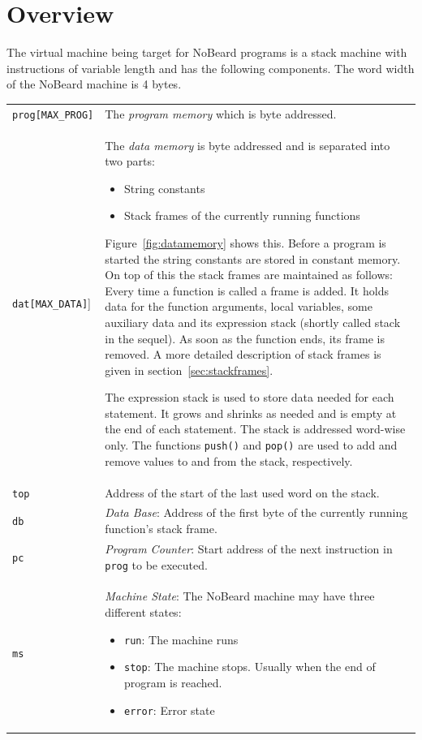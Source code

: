 \documentclass[11pt]{report}
\newcommand{\leongage}{NoBeard}
\begin{document}
\section{Overview}
The virtual machine being target for \leongage{} programs is a stack machine with instructions of variable length and has the following components. The word width of the \leongage{} machine is 4 bytes.

\begin{tabular}{p{}p{}}
	\lstinline$prog[MAX_PROG]$ & The {\em program memory} which is byte addressed. \\
	
	\lstinline$dat[MAX_DATA]$] & The {\em data memory} is byte addressed and is separated into two parts:
	\begin{itemize}
		\item String constants
		\item Stack frames of the currently running functions
	\end{itemize}
	Figure~\ref{fig:datamemory} shows this. Before a program is started the string constants are stored in constant memory. On top of this the stack frames are maintained as follows: Every time a function is called a frame is added. It holds data for the function arguments, local variables, some auxiliary data and its expression stack (shortly called stack in the sequel). As soon as the function ends, its frame is removed. A more detailed description of stack frames is given in section~\ref{sec:stackframes}.
	
	The expression stack is used to store data needed for each statement. It grows and shrinks as needed and is empty at the end of each statement. The stack is addressed word-wise only. The functions \lstinline$push()$ and \lstinline$pop()$ are used to add and remove values to and from the stack, respectively. \\
	
	\lstinline$top$ & Address of the start of the last used word on the stack. \\
	\lstinline$db$ & {\em Data Base}: Address of the first byte of the currently running function's stack frame. \\
	\lstinline$pc$ & {\em Program Counter}: Start address of the next instruction in \lstinline$prog$ to be executed.\\
	\lstinline$ms$ & {\em Machine State}: The \leongage{} machine may have three different states:
	\begin{itemize}
		\item \lstinline$run$: The machine runs
		\item \lstinline$stop$: The machine stops. Usually when the end of program is reached.
		\item \lstinline$error$: Error state
	\end{itemize}
\end{tabular}
\end{document}
